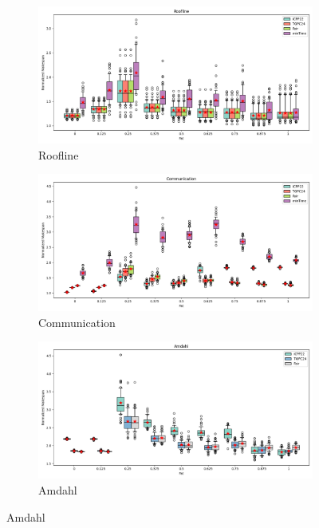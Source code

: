 \documentclass{article}
\begin{document}
\begin{figure}[htbp]
\centering
\begin{subfigure}[b]{0.32\textwidth}\includegraphics[width=\textwidth]{Results/Fat/Fat_Roofline_boxplot}\caption{Roofline}\label{fig:boxplot_figures_Fat_Roofline}\end{subfigure}
\hfill
\begin{subfigure}[b]{0.32\textwidth}\includegraphics[width=\textwidth]{Results/Fat/Fat_Communication_boxplot}\caption{Communication}\label{fig:boxplot_figures_Fat_Communication}\end{subfigure}
\hfill
\begin{subfigure}[b]{0.32\textwidth}\includegraphics[width=\textwidth]{Results/Fat/Fat_Amdahl_boxplot}\caption{Amdahl}\label{fig:boxplot_figures_Fat_Amdahl}\end{subfigure}

\end{figure}
\end{document}
